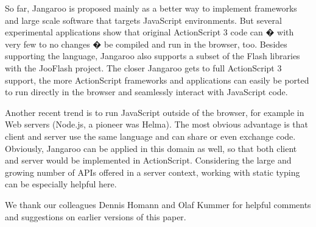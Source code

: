 \documentclass[11pt]{sigplanconf}
\begin{document}
So far, Jangaroo is proposed mainly as a better way to implement frameworks and large scale software that targets JavaScript environments. But several experimental applications\citep{jangaroo-applications} show that original ActionScript 3 code can � with very few to no changes � be compiled and run in the browser, too. Besides supporting the language, Jangaroo also supports a subset of the Flash libraries with the JooFlash project\citep{jlwiki}. The closer Jangaroo gets to full ActionScript 3 support, the more ActionScript frameworks and applications can easily be ported to run directly in the browser and seamlessly interact with JavaScript code.

Another recent trend is to run JavaScript outside of the browser, for example in Web servers (Node.js\citep{nodejs}, a pioneer was Helma\citep{helma}). The most obvious advantage is that client and server use the same language and can share or even exchange code. Obviously, Jangaroo can be applied in this domain as well, so that both client and server would be implemented in ActionScript. Considering the large and growing number of APIs offered in a server context, working with static typing can be especially helpful here.

\appendix

\acks

We thank our colleagues Dennis Homann and Olaf Kummer for helpful comments and suggestions on earlier versions of this paper.


\softraggedright

\end{document}
